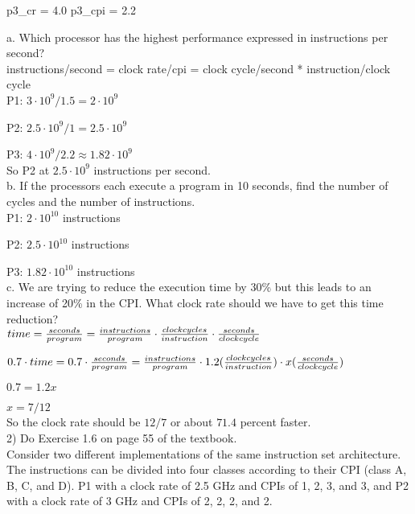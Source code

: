 p3_cr = 4.0
p3_cpi = 2.2
\fi

a. Which processor has the highest performance expressed in instructions per second? \\

instructions/second = clock rate/cpi = clock cycle/second * instruction/clock cycle \\

P1: $3 \cdot 10^9 / 1.5 = 2 \cdot 10^9$

P2: $2.5 \cdot 10 ^ 9 / 1 = 2.5 \cdot 10^9$

P3: $4 \cdot 10 ^ 9 / 2.2  \approx 1.82 \cdot 10^9$ \\

So P2 at $2.5 \cdot 10^{9}$ instructions per second. \\

b. If the processors each execute a program in 10 seconds, find the number of
cycles and the number of instructions. \\

P1: $2 \cdot 10^{10}$ instructions

P2: $2.5 \cdot 10^{10}$ instructions

P3: $1.82 \cdot 10^{10}$ instructions \\

c. We are trying to reduce the execution time by 30\% but this leads to an increase of 20\% in the CPI. What clock rate should we have to get this time reduction? \\

$time = \frac{seconds}{program} = \frac{instructions}{program} \cdot \frac{clock cycles}{ instruction} \cdot \frac{ seconds }{ clock cycle}$ 

$0.7 \cdot time = 0.7 \cdot \frac{seconds}{program} = \frac{instructions}{program} \cdot 1.2 ( \frac{clock cycles}{ instruction}) \cdot x(\frac{ seconds }{ clock cycle})$  

$0.7 = 1.2x $ 

$x = 7/12 $ \\

So the clock rate should be $12/7$ or about $71.4$ percent faster. \\

2) Do Exercise 1.6 on page 55 of the textbook. \\

Consider two different implementations of the same instruction set architecture. The instructions can be divided into four classes according to their CPI (class A, B, C, and D). P1 with a clock rate of 2.5 GHz and CPIs of 1, 2, 3, and 3, and P2 with a clock rate of 3 GHz and CPIs of 2, 2, 2, and 2. \\

